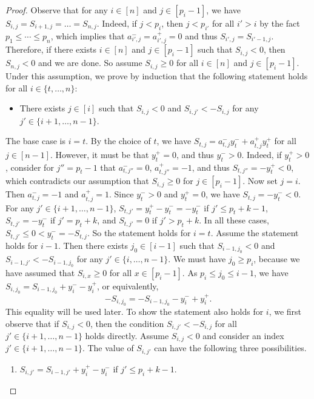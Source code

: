 \begin{proof}
Observe that for any $i \in [n]$ and $j \in [p_i-1]$, we have $S_{i,j} = S_{i+1,j} = \dots = S_{n,j}$.
Indeed, if $j < p_i$, then $j < p_{i'}$ for all $i' > i$ by the fact $p_1 \leq \cdots \leq p_n$, which implies that $a_{i',j}^- = a_{i',j}^+ = 0$ and thus $S_{i',j} = S_{i'-1,j}$.
Therefore, if there exists $i \in [n]$ and $j \in [p_i-1]$ such that $S_{i,j} < 0$, then $S_{n,j} < 0$ and we are done.
So assume $S_{i,j} \geq 0$ for all $i \in [n]$ and $j \in [p_i-1]$.
Under this assumption, we prove by induction that the following statement holds for all $i \in \{t,\dots,n\}$:
\begin{itemize}
    \item There exists $j \in [i]$ such that $S_{i,j} < 0$ and $S_{i,j'} < - S_{i,j}$ for any $j' \in \{i+1,\dots,n-1\}$.
\end{itemize}
The base case is $i = t$.
By the choice of $t$, we have $S_{t,j} = a_{t,j}^- y_t^- + a_{t,j}^+ y_t^+$ for all $j \in [n-1]$.
However, it must be that $y_t^+ = 0$, and thus $y_t^- > 0$.
Indeed, if $y_t^+ > 0$, consider for $j'' = p_t-1$ that $a_{t,j''}^- = 0$, $a_{t,j''}^+ = -1$, and thus $S_{t,j''} = -y_t^+ < 0$, which contradicts our assumption that $S_{i,j} \geq 0$ for $j \in [p_i - 1]$.
Now set $j = i$.
Then $a_{t,j}^- = -1$ and $a_{t,j}^+ = 1$.
Since $y_t^- > 0$ and $y_t^+ = 0$, we have $S_{t,j} = -y_t^- < 0$.
For any $j' \in \{i+1,\dots,n-1\}$, $S_{t,j'} = y_t^+-y_t^- = -y_t^-$ if $j' \leq p_t+k-1$, $S_{t,j'} = -y_t^-$ if $j' = p_t+k$, and $S_{t,j'} = 0$ if $j' > p_t+k$.
In all these cases, $S_{t,j'} \leq 0 < y_t^- = -S_{t,j}$.
So the statement holds for $i = t$.
Assume the statement holds for $i-1$.
Then there exists $j_0 \in [i-1]$ such that $S_{i-1,j_0} < 0$ and $S_{i-1,j'} < - S_{i-1,j_0}$ for any $j' \in \{i,\dots,n-1\}$.
We must have $j_0 \geq p_i$, because we have assumed that $S_{i,x} \geq 0$ for all $x \in [p_i-1]$.
As $p_i \leq j_0 \leq i-1$, we have $S_{i,j_0} = S_{i-1,j_0} + y_i^- - y_i^+$, or equivalently,
\begin{equation} \label{eq-Sij0}
    -S_{i,j_0} = -S_{i-1,j_0} - y_i^- + y_i^+.
\end{equation}
This equality will be used later.
To show the statement also holds for $i$, we first observe that if $S_{i,j} < 0$, then the condition $S_{i,j'} < -S_{i,j}$ for all $j' \in \{i+1,\dots,n-1\}$ holds directly.
Assume $S_{i,j} < 0$ and consider an index $j' \in \{i+1,\dots,n-1\}$.
The value of $S_{i,j'}$ can have the following three possibilities.
\begin{enumerate}
    \item $S_{i,j'} = S_{i-1,j'} + y_i^+ - y_i^-$ if $j' \leq p_i+k-1$.

\end{enumerate}
\end{proof}
